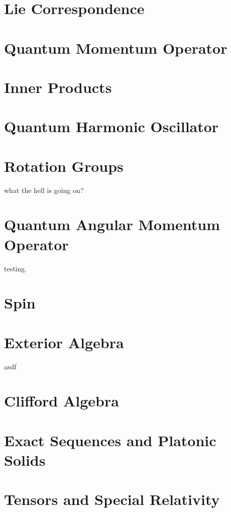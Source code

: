 \documentclass[12pt]{article}
\theoremstyle{definition}
\theoremstyle{remark}
\theoremstyle{example}
\begin{document}
\section{Lie Correspondence}

\section{Quantum Momentum Operator}

\section{Inner Products}

\section{Quantum Harmonic Oscillator}

\section{Rotation Groups}

what the hell is going on?

\section{Quantum Angular Momentum Operator}

testing.

\section{Spin}

\section{Exterior Algebra}

asdf

\section{Clifford Algebra}

\section{Exact Sequences and Platonic Solids}

\section{Tensors and Special Relativity}
\end{document}
